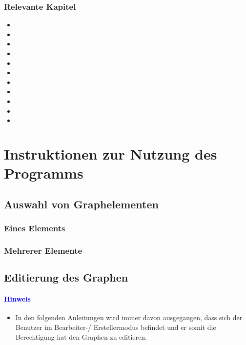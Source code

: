 \documentclass[enabledeprecatedfontcommands,fontsize=11pt,paper=a4,twoside]{scrartcl}
\newcommand*{\blue}{\textcolor{blue}}
\newcounter{one}
\begin{document}
\subsubsection{Relevante Kapitel}
\begin{itemize}
	\item {}	
	\item {}
	\item {}
	\item {}
	\item {}
	\item {}
	\item {}
	\item {}
	\item {}
	\item {}	
	\item {}
\end{itemize}


\newpage
\section{Instruktionen zur Nutzung des Programms} \label{sec:nutzung}
	\subsection{Auswahl von Graphelementen} \label{pick}
		\subsubsection{Eines Elements}
		\subsubsection{Mehrerer Elemente} 
	\subsection{Editierung des Graphen}\label{edit}
		\paragraph{\blue{Hinweis}}
		\begin{itemize}
			\item In den folgenden Anleitungen wird immer davon ausgegangen, dass sich der Benutzer im Bearbeiter-/ Erstellermodus befindet und er somit die Berechtigung hat den Graphen zu editieren.
		\end{itemize}
\end{document}

